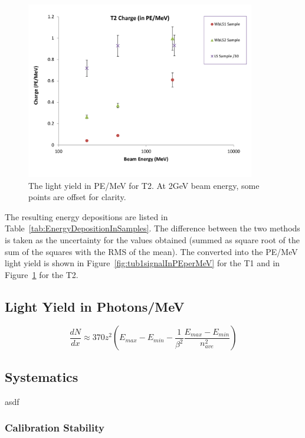 \documentclass[preprint,12pt]{elsarticle}
\begin{document}
\begin{figure}[ht]
	\centering
		\includegraphics[width=100mm]{tub2signalInPEperMEV.pdf}
	\caption{The light yield in PE/MeV for T2. At 2GeV beam energy, some points are offset for clarity.}
	\label{fig:tub2signalInPEperMeV}
\end{figure}

The resulting energy depositions are listed in Table~\ref{tab:EnergyDepositionInSamples}. The difference between the two methods is taken as the uncertainty for the values obtained (summed as square root of the sum of the squares with the RMS of the mean). The converted into the PE/MeV light yield is shown in Figure~\ref{fig:tub1signalInPEperMeV} for the T1 and in Figure~\ref{fig:tub2signalInPEperMeV} for the T2.

\subsection{Light Yield in Photons/MeV}

\begin{equation} \frac{dN}{dx} \approx 370 z^2 (E_{max} - E_{min} - \frac{1}{\beta^2} \frac{E_{max} - E_{min}}{n^2_{ave}}) \label{eq:cherenkovlight} \end{equation}


\subsection{Systematics}
\label{systematicssection}

asdf

\subsubsection{Calibration Stability}
\label{calibstabilitysection}
\end{document}
